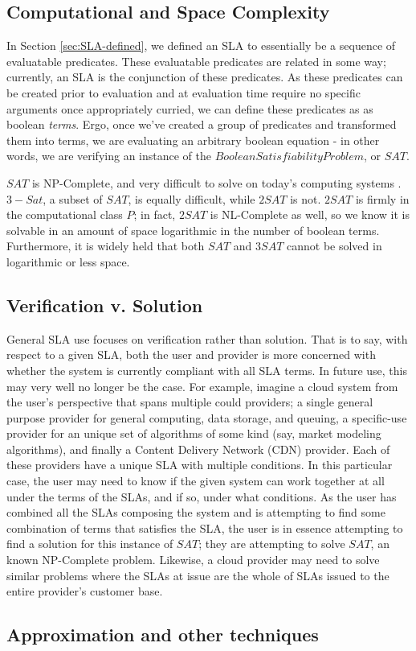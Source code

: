 \subsection{Computational and Space Complexity}
In Section \ref{sec:SLA-defined}, we defined an SLA to essentially be a sequence of evaluatable predicates.  These evaluatable predicates are related in some way; currently, an SLA is the conjunction of these predicates.  As these predicates can be created prior to evaluation and at evaluation time require no specific arguments once appropriately curried, we can define these predicates as as boolean {\it terms}.  Ergo, once we've created a group of predicates and transformed them into terms, we are evaluating an arbitrary boolean equation - in other words, we are verifying an instance of the  $ Boolean Satisfiability Problem $, or $ SAT $.

$ SAT $ is NP-Complete, and very difficult to solve on today's computing systems \cite{comptheory:sipser:intro-comp-theory}.  $ 3-Sat $, a subset of $ SAT $, is equally difficult, while $ 2SAT $ is not.  $ 2SAT $ is firmly in the computational class $ P $; in fact, $ 2SAT $ is NL-Complete as well, so we know it is solvable in an amount of space logarithmic in the number of boolean terms\cite{comptheory:papadimitriou:computational-complexity}.  Furthermore, it is widely held that both $ SAT $ and $ 3SAT $ cannot be solved in logarithmic or less space.

\subsection{Verification v. Solution}
General SLA use focuses on verification rather than solution.  That is to say, with respect to a given SLA, both the user and provider is more concerned with whether the system is currently compliant with all SLA terms.  In future use, this may very well no longer be the case.  For example, imagine a cloud system from the user's perspective that spans multiple could providers; a single general purpose provider for general computing, data storage, and queuing, a specific-use provider for an unique set of algorithms of some kind (say, market modeling algorithms), and finally a Content Delivery Network (CDN) provider.  Each of these providers have a unique SLA with multiple conditions.  In this particular case, the user may need to know if the given system can work together at all under the terms of the SLAs, and if so, under what conditions.  As the user has combined all the SLAs composing the system and is attempting to find some combination of terms that satisfies the SLA, the user is in essence attempting to find a solution for this instance of $ SAT $; they are attempting to solve $ SAT $, an known NP-Complete problem.  Likewise, a cloud provider may need to solve similar problems where the SLAs at issue are the whole of SLAs issued to the entire provider's customer base.

\subsection{Approximation and other techniques}





